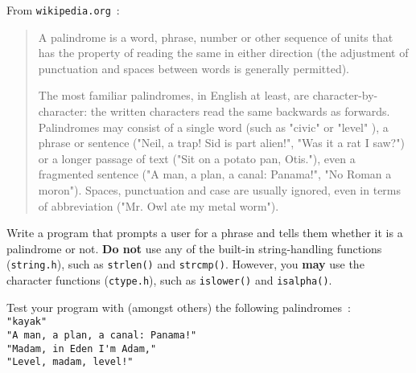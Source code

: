 
From \verb^wikipedia.org^~:

\begin{quote}
A palindrome is a word, phrase, number or other sequence of units that has the property of reading the same in either direction (the adjustment of punctuation and spaces between words is generally permitted).

The most familiar palindromes, in English at least, are character-by-character: the written characters read the same backwards as forwards. Palindromes may consist of a single word (such as "civic" or "level" ), a phrase or sentence ("Neil, a trap! Sid is part alien!", "Was it a rat I saw?") or a longer passage of text ("Sit on a potato pan, Otis."), even a fragmented sentence ("A man, a plan, a canal: Panama!", "No Roman a moron"). Spaces, punctuation and case are usually ignored, even in terms of abbreviation ("Mr. Owl ate my metal worm").
\end{quote}

\begin{exercise}
Write a program that prompts a user for a phrase and tells them whether 
it is a palindrome or not.  {\bf Do not} use any of the built-in
string-handling functions (\verb^string.h^), such as
\verb^strlen()^ and \verb^strcmp()^.
However, you {\bf may} use the character functions (\verb^ctype.h^), such as
\verb^islower()^ and \verb^isalpha()^.

Test your program with (amongst others) the following palindromes~:
\\
\verb^"kayak"^\\
\verb^"A man, a plan, a canal: Panama!"^\\
\verb^"Madam, in Eden I'm Adam,"^\\
\verb^"Level, madam, level!"^
\end{exercise}
